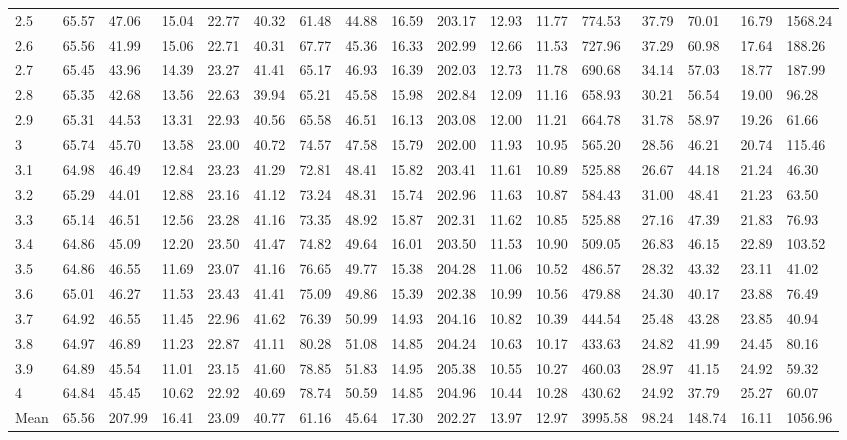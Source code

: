 \begin{adjustbox}{angle=90}
\begin{center}
{\begin{tabular}{|l|llllllllllllllll|}
2.5&65.57&47.06&15.04&22.77&40.32&61.48&44.88&16.59&203.17&12.93&11.77&774.53&37.79&70.01&16.79&1568.24  \\ 
2.6&65.56&41.99&15.06&22.71&40.31&67.77&45.36&16.33&202.99&12.66&11.53&727.96&37.29&60.98&17.64&188.26  \\ 
2.7&65.45&43.96&14.39&23.27&41.41&65.17&46.93&16.39&202.03&12.73&11.78&690.68&34.14&57.03&18.77&187.99  \\ 
2.8&65.35&42.68&13.56&22.63&39.94&65.21&45.58&15.98&202.84&12.09&11.16&658.93&30.21&56.54&19.00&96.28  \\ 
2.9&65.31&44.53&13.31&22.93&40.56&65.58&46.51&16.13&203.08&12.00&11.21&664.78&31.78&58.97&19.26&61.66  \\ 
3&65.74&45.70&13.58&23.00&40.72&74.57&47.58&15.79&202.00&11.93&10.95&565.20&28.56&46.21&20.74&115.46  \\ 
3.1&64.98&46.49&12.84&23.23&41.29&72.81&48.41&15.82&203.41&11.61&10.89&525.88&26.67&44.18&21.24&46.30  \\ 
3.2&65.29&44.01&12.88&23.16&41.12&73.24&48.31&15.74&202.96&11.63&10.87&584.43&31.00&48.41&21.23&63.50  \\ 
3.3&65.14&46.51&12.56&23.28&41.16&73.35&48.92&15.87&202.31&11.62&10.85&525.88&27.16&47.39&21.83&76.93  \\ 
3.4&64.86&45.09&12.20&23.50&41.47&74.82&49.64&16.01&203.50&11.53&10.90&509.05&26.83&46.15&22.89&103.52  \\ 
3.5&64.86&46.55&11.69&23.07&41.16&76.65&49.77&15.38&204.28&11.06&10.52&486.57&28.32&43.32&23.11&41.02  \\ 
3.6&65.01&46.27&11.53&23.43&41.41&75.09&49.86&15.39&202.38&10.99&10.56&479.88&24.30&40.17&23.88&76.49  \\ 
3.7&64.92&46.55&11.45&22.96&41.62&76.39&50.99&14.93&204.16&10.82&10.39&444.54&25.48&43.28&23.85&40.94  \\ 
3.8&64.97&46.89&11.23&22.87&41.11&80.28&51.08&14.85&204.24&10.63&10.17&433.63&24.82&41.99&24.45&80.16  \\ 
3.9&64.89&45.54&11.01&23.15&41.60&78.85&51.83&14.95&205.38&10.55&10.27&460.03&28.97&41.15&24.92&59.32  \\ 
4&64.84&45.45&10.62&22.92&40.69&78.74&50.59&14.85&204.96&10.44&10.28&430.62&24.92&37.79&25.27&60.07  \\ \hline \hline
Mean&65.56&207.99&16.41&23.09&40.77&61.16&45.64&17.30&202.27&13.97&12.97&3995.58&98.24&148.74&16.11&1056.96  \\ \hline
\end{tabular}
    }
\end{center}
\end{adjustbox}


\newpage

